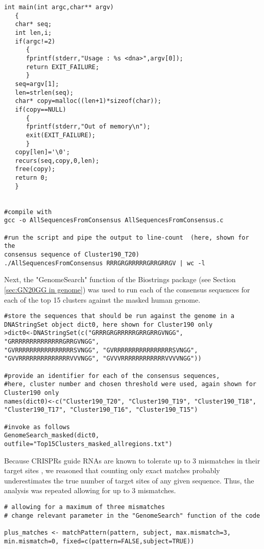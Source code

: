 \begin{footnotesize}
\begin{lstlisting}
int main(int argc,char** argv)
   {
   char* seq;
   int len,i;
   if(argc!=2)
      {
      fprintf(stderr,"Usage : %s <dna>",argv[0]);
      return EXIT_FAILURE;
      }
   seq=argv[1];
   len=strlen(seq);
   char* copy=malloc((len+1)*sizeof(char));
   if(copy==NULL)
      {
      fprintf(stderr,"Out of memory\n");
      exit(EXIT_FAILURE);
      }
   copy[len]='\0';
   recurs(seq,copy,0,len);
   free(copy);
   return 0;
   }


#compile with
gcc -o AllSequencesFromConsensus AllSequencesFromConsensus.c

#run the script and pipe the output to line-count  (here, shown for the 
consensus sequence of Cluster190_T20)
./AllSequencesFromConsensus RRRGRGRRRRRGRRGRRGV | wc -l
\end{lstlisting}

Next, the "GenomeSearch" function of the Biostrings package (see Section \ref{sec:GN20GG in genome}) was used to run each of the consensus sequences for each of the top 15 clusters against the masked human genome. 

\begin{lstlisting}
#store the sequences that should be run against the genome in a
DNAStringSet object dict0, here shown for Cluster190 only
>dict0<-DNAStringSet(c("GRRRGRGRRRRRGRRGRRGVNGG", "GRRRRRRRRRRRRRRGRRGVNGG",
"GVRRRRRRRRRRRRRRRRSVNGG", "GVRRRRRRRRRRRRRRRRSVNGG",
"GVVRRRRRRRRRRRRRRVVVNGG", "GVVVRRRRRRRRRRRRVVVVNGG"))

#provide an identifier for each of the consensus sequences,
#here, cluster number and chosen threshold were used, again shown for Cluster190 only
names(dict0)<-c("Cluster190_T20", "Cluster190_T19", "Cluster190_T18", "Cluster190_T17", "Cluster190_T16", "Cluster190_T15")

#invoke as follows
GenomeSearch_masked(dict0, outfile="Top15Clusters_masked_allregions.txt")
\end{lstlisting}

Because CRISPRs guide RNAs are known to tolerate up to 3 mismatches in their target sites \cite{Mali:2013ft}, we reasoned that counting only exact matches probably underestimates the true number of target sites of any given sequence. Thus, the analysis was repeated allowing for up to 3 mismatches.

\begin{lstlisting}
# allowing for a maximum of three mismatches
# change relevant parameter in the "GenomeSearch" function of the code

plus_matches <- matchPattern(pattern, subject, max.mismatch=3, min.mismatch=0, fixed=c(pattern=FALSE,subject=TRUE))


\end{lstlisting}
\end{footnotesize}
